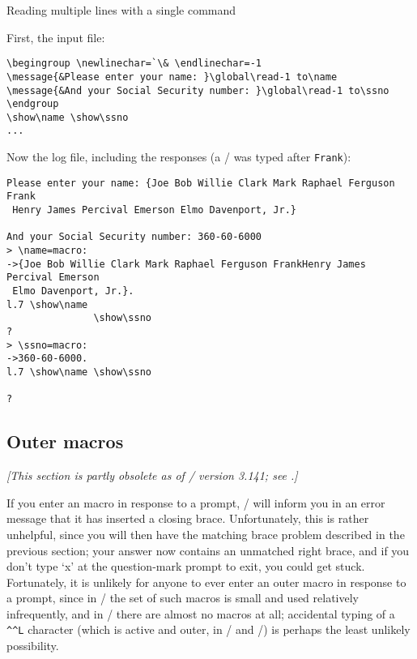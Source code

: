{\begin{example*}
\begin{examplebox}
\caption[]{Reading multiple lines with a single  command}%
\label{ex:readbrace}%
First, the input file:
\begin{verbatim}
\begingroup \newlinechar=`\& \endlinechar=-1
\message{&Please enter your name: }\global\read-1 to\name
\message{&And your Social Security number: }\global\read-1 to\ssno
\endgroup
\show\name \show\ssno
...
\end{verbatim}
Now the log file, including the responses (a \return/ was typed after
{\tt Frank}):
\begin{verbatim}
Please enter your name: {Joe Bob Willie Clark Mark Raphael Ferguson Frank
 Henry James Percival Emerson Elmo Davenport, Jr.}

And your Social Security number: 360-60-6000
> \name=macro:
->{Joe Bob Willie Clark Mark Raphael Ferguson FrankHenry James Percival Emerson
 Elmo Davenport, Jr.}.
l.7 \show\name
               \show\ssno
?
> \ssno=macro:
->360-60-6000.
l.7 \show\name \show\ssno

?
\end{verbatim}
\end{examplebox}
\end{example*}

\subsection{Outer macros}\label{ss:readouter}

{\em[This section is partly obsolete as of \tex/ version 3.141; see
.]}

If you enter an  macro in response to a  prompt,
\tex/ will inform you in an error message
that it has inserted a closing brace.
Unfortunately, this is rather unhelpful, since you will then have the
matching brace problem described in the previous section; your answer
now contains an unmatched right brace, and if you don't type `x' at the
question-mark prompt to exit, you could get stuck.
Fortunately, it is unlikely for anyone to ever enter an outer macro in
response to a prompt, since in \plaintex/ the set of such macros is
small and used relatively infrequently, and in \latex/ there are almost
no  macros at all; accidental typing of a \verb;^^L;
character (which is active and outer, in \plaintex/ and \latex/) is
perhaps the least unlikely possibility.


}
